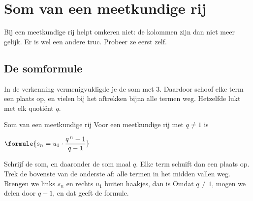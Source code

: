 \section{Som van een meetkundige rij}

Bij een meetkundige rij helpt omkeren niet: de kolommen zijn dan niet meer gelijk. Er is wel een andere truc. Probeer ze eerst zelf.

\begin{oefeningen}
\end{oefeningen}


\subsection{De somformule}

In de verkenning vermenigvuldigde je de som met 3. Daardoor schoof elke term een plaats op, en vielen bij het aftrekken bijna alle termen weg. Hetzelfde lukt met elk quotiënt $q$.

\begin{theorie}
\begin{stelling}{Som van een meetkundige rij}
Voor een meetkundige rij met $q \neq 1$ is

\vspace{1mm}
\qquad $\formule{s_n = u_1 \cdot \dfrac{q^{\,n} - 1}{q - 1}}$
\end{stelling}

\begin{bewijs}
Schrijf de som, en daaronder de som maal $q$. Elke term schuift dan een plaats op. Trek de bovenste van de onderste af: alle termen in het midden vallen weg.
Brengen we links $s_n$ en rechts $u_1$ buiten haakjes, dan is
Omdat $q \neq 1$, mogen we delen door $q - 1$, en dat geeft de formule.
\end{bewijs}
\end{theorie}

